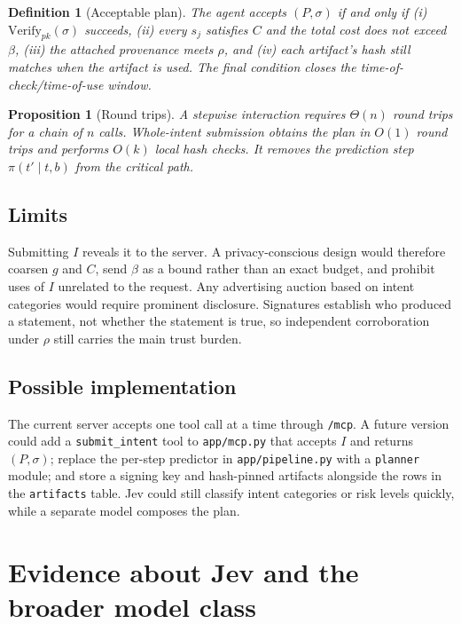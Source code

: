 \documentclass[11pt]{article}
\newtheorem{definition}{Definition}
\newtheorem{proposition}{Proposition}
\begin{document}
\begin{definition}[Acceptable plan]
The agent accepts $(P,\sigma)$ if and only if (i) $\mathrm{Verify}_{pk}(\sigma)$ succeeds, (ii) every
$s_j$ satisfies $C$ and the total cost does not exceed $\beta$, (iii) the attached provenance meets
$\rho$, and (iv) each artifact's hash still matches when the artifact is used. The final condition
closes the time-of-check/time-of-use window.
\end{definition}

\begin{proposition}[Round trips]
A stepwise interaction requires $\Theta(n)$ round trips for a chain of $n$ calls. Whole-intent
submission obtains the plan in $O(1)$ round trips and performs $O(k)$ local hash checks. It removes
the prediction step $\pi(t'\mid t,b)$ from the critical path.
\end{proposition}

\subsection{Limits}
Submitting $I$ reveals it to the server. A privacy-conscious design would therefore coarsen $g$ and
$C$, send $\beta$ as a bound rather than an exact budget, and prohibit uses of $I$ unrelated to the
request. Any advertising auction based on intent categories would require prominent disclosure.
Signatures establish who produced a statement, not whether the statement is true, so independent
corroboration under $\rho$ still carries the main trust burden.

\subsection{Possible implementation}
The current server accepts one tool call at a time through \texttt{/mcp}. A future version could add
a \texttt{submit\_intent} tool to \texttt{app/mcp.py} that accepts $I$ and returns $(P,\sigma)$; replace
the per-step predictor in \texttt{app/pipeline.py} with a \texttt{planner} module; and store a signing
key and hash-pinned artifacts alongside the rows in the \texttt{artifacts} table. Jev could still
classify intent categories or risk levels quickly, while a separate model composes the plan.

\section{Evidence about Jev and the broader model class}
\end{document}
